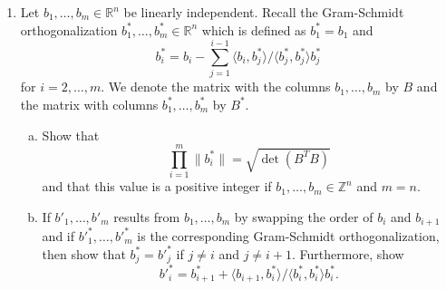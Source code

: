 \documentclass[12pt,a4paper]{article}
\begin{document}
\begin{enumerate}
\item Let  $b_1,\dots,b_m ∈ ℝ^n$  be linearly independent. Recall the Gram-Schmidt orthogonalization $b_1^*,\dots,b_m^* ∈ ℝ^n $ which is defined as $b_1^* = b_1$ and
  \begin{displaymath}
    b_i^* = b_i - ∑_{j=1}^{i-1} 〈b_i,b_j^*〉 / 〈b_j^*,b_j^*〉 b_j^* 
  \end{displaymath}
  for 
  $i=2,\dots,m$. We denote the matrix with the columns $b_1,\dots,b_m$  by $B$ and the matrix with columns $b_1^*,\dots,b_m^*$ by $B^*$.
  \begin{enumerate}[a)]
  \item Show that
    \begin{displaymath}
      ∏_{i=1}^m \|b_i^*\| = \sqrt{\det(B^T B)} 
    \end{displaymath}
    and that this value is a positive integer if  $b_1,\dots,b_m ∈ℤ^n$ and $m=n$.
  \item If $b'_1,\dots,b'_m $ results from $b_1,\dots,b_m$ by swapping the order of $b_i$ and $b_{i+1}$ and  if ${b'}^*_1,\dots,{b'}^*_m $ is the corresponding Gram-Schmidt orthogonalization, then show that $b_j^*={b'}^*_j$ if $j≠i$ and $j ≠ i+1$. Furthermore, show
    \begin{displaymath}
     {b'}^*_i = b_{i+1}^* + 〈b_{i+1},b_i^*〉 / 〈b_i^*,b_i^*〉 b_i^*. 
    \end{displaymath}
  \end{enumerate}
  
\end{enumerate}
\end{document}
